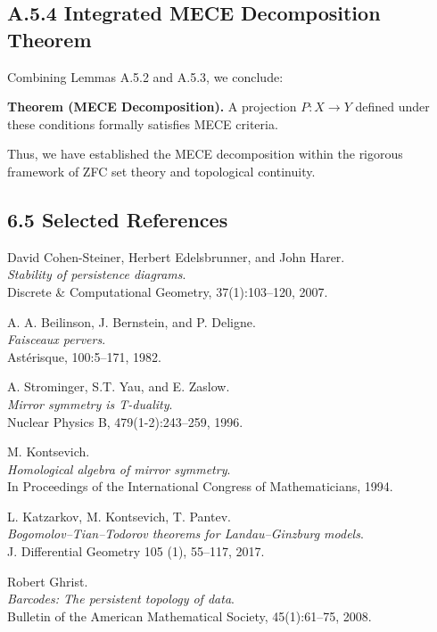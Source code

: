 \documentclass[11pt]{article}
\begin{document}
\subsection*{A.5.4 Integrated MECE Decomposition Theorem}
Combining Lemmas A.5.2 and A.5.3, we conclude:

\textbf{Theorem (MECE Decomposition).}  
A projection \( P: X \rightarrow Y \) defined under these conditions formally satisfies MECE criteria.

Thus, we have established the MECE decomposition within the rigorous framework of ZFC set theory and topological continuity.



\subsection*{6.5 Selected References}

\begin{thebibliography}{9}

David Cohen-Steiner, Herbert Edelsbrunner, and John Harer.\\
\textit{Stability of persistence diagrams}.\\
Discrete \& Computational Geometry, 37(1):103--120, 2007.

A. A. Beilinson, J. Bernstein, and P. Deligne.\\
\textit{Faisceaux pervers}.\\
Ast\'erisque, 100:5–171, 1982.

A. Strominger, S.T. Yau, and E. Zaslow.\\
\textit{Mirror symmetry is T-duality}.\\
Nuclear Physics B, 479(1-2):243–259, 1996.

M. Kontsevich.\\
\textit{Homological algebra of mirror symmetry}.\\
In Proceedings of the International Congress of Mathematicians, 1994.

L. Katzarkov, M. Kontsevich, T. Pantev.\\
\textit{Bogomolov–Tian–Todorov theorems for Landau–Ginzburg models}.\\
J. Differential Geometry 105 (1), 55–117, 2017.

Robert Ghrist.\\
\textit{Barcodes: The persistent topology of data}.\\
Bulletin of the American Mathematical Society, 45(1):61--75, 2008.

\end{thebibliography}
\end{document}
